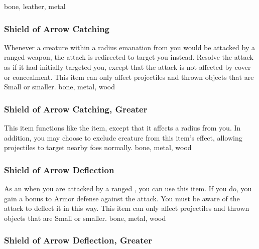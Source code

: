  
 bone, leather, metal
\lowercase{\hypertarget{item:Shield of Arrow Catching}{}}\label{item:Shield of Arrow Catching}
\hypertarget{item:Shield of Arrow Catching}{\subsubsection{Shield of Arrow Catching\hfill{}}}
Whenever a creature within a \areamed radius emanation from you would be attacked by a ranged weapon, the attack is redirected to target you instead.
Resolve the attack as if it had initially targeted you, except that the attack is not affected by cover or concealment.
This item can only affect projectiles and thrown objects that are Small or smaller.
 
 bone, metal, wood
\lowercase{\hypertarget{item:Shield of Arrow Catching, Greater}{}}\label{item:Shield of Arrow Catching, Greater}
\hypertarget{item:Shield of Arrow Catching, Greater}{\subsubsection{Shield of Arrow Catching, Greater\hfill{}}}
This item functions like the  item, except that it affects a \arealarge radius from you.
In addition, you may choose to exclude creature from this item's effect, allowing projectiles to target nearby foes normally.
 
 bone, metal, wood
\lowercase{\hypertarget{item:Shield of Arrow Deflection}{}}\label{item:Shield of Arrow Deflection}
\hypertarget{item:Shield of Arrow Deflection}{\subsubsection{Shield of Arrow Deflection\hfill{}}}
As an  when you are attacked by a ranged , you can use this item.
If you do, you gain a  bonus to Armor defense against the attack.
You must be aware of the attack to deflect it in this way.
This item can only affect projectiles and thrown objects that are Small or smaller.
 
 bone, metal, wood
\lowercase{\hypertarget{item:Shield of Arrow Deflection, Greater}{}}\label{item:Shield of Arrow Deflection, Greater}
\hypertarget{item:Shield of Arrow Deflection, Greater}{\subsubsection{Shield of Arrow Deflection, Greater\hfill{}}}

